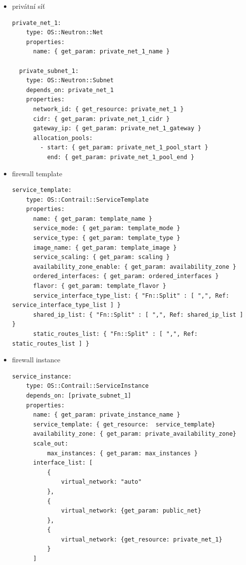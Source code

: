 \begin{itemize}

\item privátní síť


\begin{lstlisting}[caption=Privátní síť]
  private_net_1:
    type: OS::Neutron::Net
    properties:
      name: { get_param: private_net_1_name } 

  private_subnet_1:
    type: OS::Neutron::Subnet
    depends_on: private_net_1
    properties:
      network_id: { get_resource: private_net_1 }
      cidr: { get_param: private_net_1_cidr }
      gateway_ip: { get_param: private_net_1_gateway }
      allocation_pools:
        - start: { get_param: private_net_1_pool_start }
          end: { get_param: private_net_1_pool_end }
\end{lstlisting}


\item firewall template

\begin{lstlisting}[caption=Firewall servisní instance]
service_template:
    type: OS::Contrail::ServiceTemplate
    properties:
      name: { get_param: template_name }
      service_mode: { get_param: template_mode }
      service_type: { get_param: template_type }
      image_name: { get_param: template_image }
      service_scaling: { get_param: scaling }
      availability_zone_enable: { get_param: availability_zone }
      ordered_interfaces: { get_param: ordered_interfaces }
      flavor: { get_param: template_flavor }
      service_interface_type_list: { "Fn::Split" : [ ",", Ref: service_interface_type_list ] }
      shared_ip_list: { "Fn::Split" : [ ",", Ref: shared_ip_list ] }
      static_routes_list: { "Fn::Split" : [ ",", Ref: static_routes_list ] }

\end{lstlisting}

\item firewall instance
\begin{lstlisting}[caption=Privátní síť]
 service_instance:
    type: OS::Contrail::ServiceInstance
    depends_on: [private_subnet_1]
    properties:
      name: { get_param: private_instance_name }
      service_template: { get_resource:  service_template}
      availability_zone: { get_param: private_availability_zone}
      scale_out: 
          max_instances: { get_param: max_instances }
      interface_list: [
          {
              virtual_network: "auto"
          },
          {
              virtual_network: {get_param: public_net}
          },
          {
              virtual_network: {get_resource: private_net_1}
          }
      ]
\end{lstlisting}



\end{itemize}
